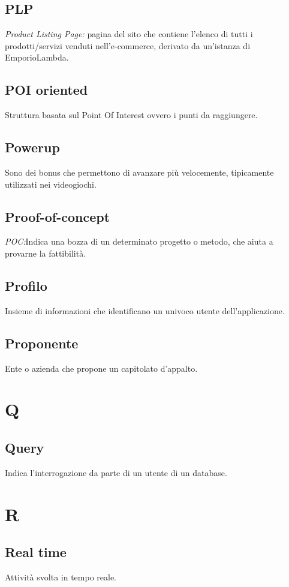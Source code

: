 \subsection*{PLP}
\textit{Product Listing Page:} pagina del sito che contiene l'elenco di tutti i prodotti/servizi venduti nell'e-commerce, derivato da un'istanza di EmporioLambda.

\subsection*{POI oriented}
Struttura basata sul Point Of Interest ovvero i punti da raggiungere.

\subsection*{Powerup}
Sono dei bonus che permettono di avanzare più velocemente, tipicamente utilizzati nei videogiochi.

\subsection*{Proof-of-concept}
\textit{POC:}Indica una bozza di un determinato progetto o metodo, che aiuta a provarne la fattibilità.

\subsection*{Profilo}
Insieme di informazioni che identificano un univoco utente dell'applicazione.

\subsection*{Proponente}
Ente o azienda che propone un capitolato d'appalto.

\newpage
\section{Q}
\subsection*{Query}
Indica l'interrogazione da parte di un utente di un database.

\newpage
\section{R}
\subsection*{Real time}
Attività svolta in tempo reale.

